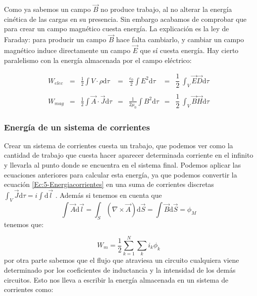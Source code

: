 \documentclass[12pt,a4paper]{article}
\newcommand{\D}{\mathrm{d}}
\begin{document}
Como ya sabemos un campo $\vec{B}$ no produce trabajo, al no alterar la energía cinética de las cargas en su presencia. Sin embargo acabamos de comprobar que para crear un campo magnético cuesta energía. La explicación es la ley de Faraday: para producir un campo $\vec{B}$ hace falta cambiarlo, y cambiar un campo magnético induce directamente un campo $\vec{E}$ que sí cuesta energía. Hay cierto paralelismo con la energía almacenada por el campo eléctrico:

\begin{equation}
\begin{array}{lllllll}

W_{elec} & =  & \frac{1}{2} \int V \cdot \rho \D \tau & = & \frac{\varepsilon_0}{2} \int E^2 \D \tau & = & \dfrac{1}{2} \ \int_V \vec{E} \vec{D} \D \tau \\ \\

W_{mag} & = & \frac{1}{2} \int \vec{A} \cdot \vec{J} \D \tau & = & \frac{1}{2\mu_0} \int B^2 \D \tau & = & \dfrac{1}{2} \ \int_V \vec{B} \vec{H} \D \tau

\end{array}
\end{equation}

\subsubsection{Energía de un sistema de corrientes}

Crear un sistema de corrientes cuesta un trabajo, que podemos ver como la cantidad de trabajo que cuesta hacer aparecer determinada corriente en el infinito y llevarla al punto donde se encuentra en el sistema final. Podemos aplicar las ecuaciones anteriores para calcular esta energía, ya que podemos convertir la ecuación \ref{Ec:5-Energiacorrientes} en una suma de corrientes discretas $\int_V \vec{J} \D \tau = i \int \D \vec{l}$ . Además si tenemos en cuenta que $$ \int \vec{A} \D \vec{l} =\int_S (\nabla \times \vec{A})\D \vec{S} = \int \vec{B} \D \vec{S}  = \phi_M$$tenemos que: 

\begin{equation}
W_m = \dfrac{1}{2} \sum_{k=1}^N \sum_k i_k \phi_k
\end{equation}
por otra parte sabemos que el flujo que atraviesa un circuito cualquiera viene determinado por los coeficientes de inductancia y la intensidad de los demás circuitos. Esto nos lleva a escribir la energía almacenada en un sistema de corrientes como:
\end{document}
